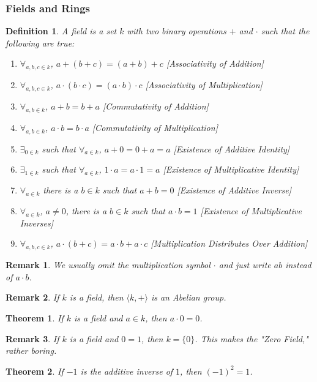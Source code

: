 \documentclass{article}
\theoremstyle{mystyle}
\newtheorem{theorem}{Theorem}[section]
\newtheorem{definition}{Definition}[section]
\newtheorem{remark}{Remark}[section]
\begin{document}
\subsubsection{Fields and Rings}
\begin{definition}
A field is a set $k$ with two binary operations $+$ and $\cdot$ such that the following are true:
\begin{enumerate}
    \item $\forall_{a,b,c\in k}$, $a+(b+c)=(a+b)+c$ \hfill [Associativity of Addition]
    \item $\forall_{a,b,c\in k}$, $a\cdot(b\cdot c) = (a\cdot b)\cdot c$ \hfill [Associativity of Multiplication]
    \item $\forall_{a,b\in k}$, $a+b=b+a$ \hfill [Commutativity of Addition]
    \item $\forall_{a,b\in k}$, $a\cdot b = b\cdot a$ \hfill [Commutativity of Multiplication]
    \item $\exists_{0 \in k}$ such that $\forall_{a\in k}$, $a+0=0+a = a$ \hfill [Existence of Additive Identity]
    \item $\exists_{1\in k}$ such that $\forall_{a\in k}$, $1\cdot a=a\cdot 1 = a$ \hfill [Existence of Multiplicative Identity]
    \item $\forall_{a\in k}$ there is a $b\in k$ such that $a+b=0$ \hfill [Existence of Additive Inverse]
    \item $\forall_{a\in k}$, $a\ne 0$, there is a $b\in k$ such that $a\cdot b = 1$ \hfill [Existence of Multiplicative Inverses]
    \item $\forall_{a,b,c\in k}$, $a\cdot(b+c) = a\cdot b + a\cdot c$ \hfill [Multiplication Distributes Over Addition]
\end{enumerate}
\end{definition}
\begin{remark}
We usually omit the multiplication symbol $\cdot$ and just write $ab$ instead of $a\cdot b$.
\end{remark}
\begin{remark}
If $k$ is a field, then $\langle k, + \rangle$ is an Abelian group.
\end{remark}
\begin{theorem}
If $k$ is a field and $a\in k$, then $a\cdot 0 = 0$.
\end{theorem}
\begin{remark}
If $k$ is a field and $0=1$, then $k=\{0\}$. This makes the "Zero Field," rather boring.
\end{remark}
\begin{theorem}
If $-1$ is the additive inverse of $1$, then $(-1)^2 = 1$.
\end{theorem}
\end{document}

